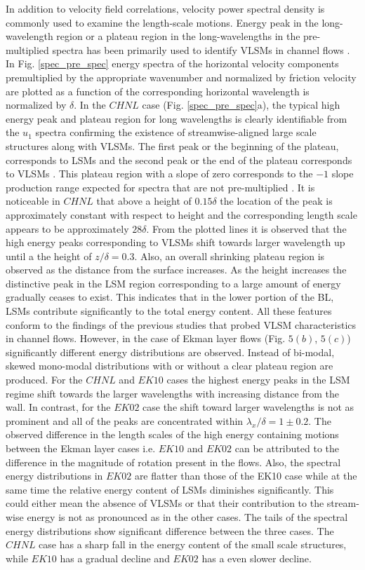 \documentclass{svjour3}                     %
\begin{document}
In addition to velocity field correlations, velocity power spectral density is commonly used to examine the length-scale motions. Energy peak in the  long-wavelength region or a plateau region in the long-wavelengths in the pre-multiplied spectra has been primarily used to identify VLSMs in channel flows \citep{guala_adrian_jfm2006, fang2015blm}. In Fig. \ref{spec_pre_spec} energy spectra of the horizontal velocity components premultiplied by the appropriate wavenumber and normalized by friction velocity are plotted as a function of the corresponding horizontal wavelength is normalized by $\delta$.  In the $CHNL$ case (Fig. \ref{spec_pre_spec}a), the typical high energy peak and plateau region for long wavelengths is clearly identifiable from the $u_1$ spectra confirming the existence of streamwise-aligned large scale structures along with VLSMs. The first peak or the beginning of the plateau, corresponds to LSMs and the second peak or the end of the plateau corresponds to VLSMs \citep{kim_adrian_pof99}. This plateau region with a slope of zero  corresponds to the $-1$ slope production range expected for spectra that are not pre-multiplied \citep{perry_chng_jfm_86,saddoughi1994}. It is noticeable in $CHNL$  that above a height of $0.15\delta$ the location of the peak is approximately constant with respect to height and the corresponding length scale appears to be approximately $28\delta$. From the plotted lines it is observed that the high energy peaks corresponding to VLSMs shift towards larger wavelength up until a the height of $z/\delta = 0.3$. Also, an overall shrinking plateau region is observed as the distance from the surface increases. As the height increases the distinctive peak in the LSM region corresponding to a large amount of energy gradually ceases to exist. This indicates that in the lower portion of the BL, LSMs contribute significantly to the total energy content. All these features conform to the findings of the previous studies that probed  VLSM characteristics in channel flows. However, in the case of Ekman layer flows (Fig. $5(b)$, $5(c)$)  significantly  different energy distributions are observed. Instead of bi-modal, skewed mono-modal distributions with or without a clear plateau region are produced. For the $CHNL$ and $EK10$ cases the highest energy peaks in the LSM regime shift towards the larger wavelengths with increasing distance from the wall. In contrast, for the $EK02$ case the shift toward  larger wavelengths is not as prominent and all of the peaks are concentrated within $\lambda_x/\delta=1 \pm 0.2$. The observed difference in the length scales of the high energy containing motions between the Ekman layer cases i.e. $EK10$ and $EK02$ can be attributed to the difference in the magnitude of rotation present in the flows. Also, the spectral energy distributions in $EK02$  are flatter than those of the EK10 case while at the same time the relative energy content of LSMs diminishes significantly. This could either mean the absence of VLSMs or that their contribution to the stream-wise energy is not as pronounced as in the other cases. The tails of the spectral energy distributions show significant difference between the three cases. The $CHNL$ case has a sharp fall in the energy content of the small scale structures, while $EK10$ has  a gradual decline and $EK02$ has a even slower decline. 
\end{document}
